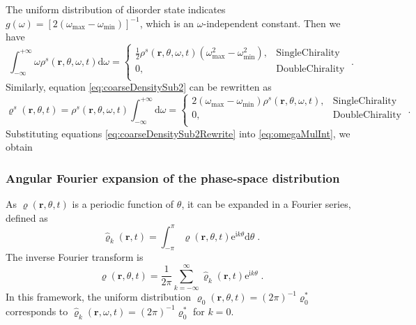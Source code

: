 \documentclass{article}
\begin{document}
The uniform distribution of disorder state indicates $g\left( \omega \right) =\left[ 2\left( \omega _{\max}-\omega _{\min} \right) \right] ^{-1}$, which is an $\omega$-independent constant. Then we have
\begin{equation}
    \label{eq:omegaMulInt}
    \int_{-\infty}^{+\infty}{\omega \rho ^s\left( \mathbf{r},\theta ,\omega ,t \right) \text{d}\omega}=\begin{cases}
        \frac{1}{2}\rho ^s\left( \mathbf{r},\theta ,\omega ,t \right) \left( \omega _{\max}^{2}-\omega _{\min}^{2} \right) ,&		\text{Single} \text{Chirality}\\
        0,&		\text{Double} \text{Chirality}\\
    \end{cases}\;.
\end{equation}
Similarly, equation \eqref{eq:coarseDensitySub2} can be rewritten as
\begin{equation}
    \label{eq:coarseDensitySub2Rewrite}
    \varrho ^s\left( \mathbf{r},\theta ,t \right) =\rho ^s\left( \mathbf{r},\theta ,\omega ,t \right) \int_{-\infty}^{+\infty}{\text{d}\omega}=\begin{cases}
        2\left( \omega _{\max}-\omega _{\min} \right) \rho ^s\left( \mathbf{r},\theta ,\omega ,t \right) ,&		\text{Single} \text{Chirality}\\
        0,&		\text{Double} \text{Chirality}\\
    \end{cases}\;.
\end{equation}
Substituting equations \eqref{eq:coarseDensitySub2Rewrite} into \eqref{eq:omegaMulInt}, we obtain 

\subsubsection{Angular Fourier expansion of the phase-space distribution}
As $\varrho(\mathbf{r},\theta,t)$ is a periodic function of $\theta$, it can be expanded in a Fourier series, defined as
\begin{equation}
    \hat{\varrho}_k(\mathbf{r},t)=\int_{-\pi}^\pi \varrho(\mathbf{r},\theta,t) \mathrm{e}^{\mathrm{i}k\theta}\mathrm{d}\theta\;.
\end{equation}
The inverse Fourier transform is
\begin{equation}
    \label{eq:inverseFourier}
    \varrho (\mathbf{r},\theta ,t)=\frac{1}{2\pi}\sum_{k=-\infty}^{\infty}{\hat{\varrho}_k(\mathbf{r},t)\mathrm{e}^{\mathrm{i}k\theta}\;.}
\end{equation}
In this framework, the uniform distribution $\varrho _0(\mathbf{r},\theta ,t)=\left( 2\pi \right) ^{-1}\varrho _{0}^{*}$ corresponds to $\hat{\varrho}_k(\mathbf{r},\omega,t)=\left( 2\pi \right) ^{-1}\varrho _{0}^{*}$ for $k=0$.
\end{document}
